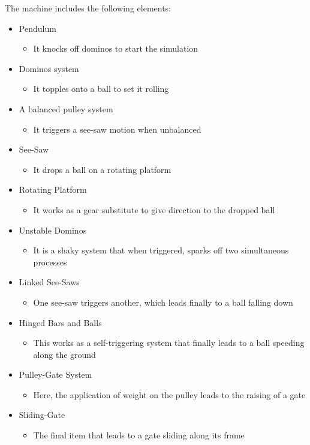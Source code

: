 \documentclass[a4paper,11pt]{article}
\begin{document}
The machine includes the following elements:

\begin{itemize}

\item Pendulum 
\begin{itemize}
\item It knocks off dominos to start the simulation
\end{itemize}
\item Dominos system
\begin{itemize}
\item It topples onto a ball to set it rolling
\end{itemize}
\item A balanced pulley system
\begin{itemize}
\item It triggers a see-saw motion when unbalanced
\end{itemize}
\item See-Saw
\begin{itemize}
\item It drops a ball on a rotating platform
\end{itemize}
\item Rotating Platform
\begin{itemize}
\item It works as a gear substitute to give direction to the dropped ball
\end{itemize}
\item Unstable Dominos
\begin{itemize}
\item It is a shaky system that when triggered, sparks off two simultaneous processes
\end{itemize}
\item Linked See-Saws
\begin{itemize}
\item One see-saw triggers another, which leads finally to a ball falling down
\end{itemize}
\item Hinged Bars and Balls
\begin{itemize}
\item This works as a self-triggering system that finally leads to a ball speeding along the ground
\end{itemize}
\item Pulley-Gate System
\begin{itemize}
\item Here, the application of weight on the pulley leads to the raising of a gate
\end{itemize}
\item Sliding-Gate
\begin{itemize}
\item The final item that leads to a gate sliding along its frame
\end{itemize}

\end{itemize}
\end{document}

